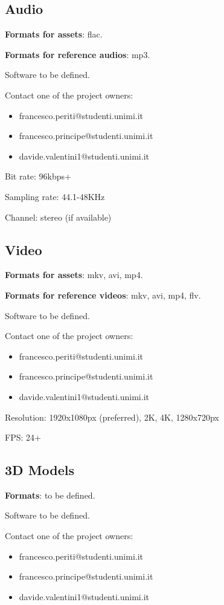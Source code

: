 \documentclass[12pt]{article}
\begin{document}
\subsection{Audio}

\textbf{Formats for assets}: flac.

\textbf{Formats for reference audios}: mp3.

Software to be defined.

Contact one of the project owners:
\begin{itemize}
	\item francesco.periti@studenti.unimi.it
	\item francesco.principe@studenti.unimi.it
	\item davide.valentini1@studenti.unimi.it
\end{itemize}

Bit rate: 96kbps+

Sampling rate: 44.1-48KHz

Channel: stereo (if available)

\subsection{Video}
\textbf{Formats for assets}: mkv, avi, mp4.

\textbf{Formats for reference videos}: mkv, avi, mp4, flv.

Software to be defined.

Contact one of the project owners:
\begin{itemize}
	\item francesco.periti@studenti.unimi.it
	\item francesco.principe@studenti.unimi.it
	\item davide.valentini1@studenti.unimi.it
\end{itemize}

Resolution: 1920x1080px (preferred), 2K, 4K, 1280x720px

FPS: 24+

\subsection{3D Models}
\textbf{Formats}: to be defined.

Software to be defined.

Contact one of the project owners:
\begin{itemize}
	\item francesco.periti@studenti.unimi.it
	\item francesco.principe@studenti.unimi.it
	\item davide.valentini1@studenti.unimi.it
\end{itemize}
\end{document}
